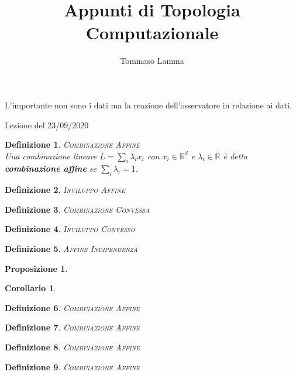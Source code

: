 \documentclass{article}
\title{Appunti di Topologia Computazionale}
\author{Tommaso Lamma}
\newtheorem{defn}{Definizione}[section]
\newtheorem{prop}[thm]{Proposizione}
\newtheorem{cor}{Corollario}[thm]
\newcommand{\bb}[1]{\textbf{#1}}
\newcommand{\R}{\mathbb{R}}
\begin{document}
\maketitle
L'importante non sono i dati ma la reazione dell'osservatore in relazione ai dati.\\
  \begin{section}{Lezione del 23/09/2020}
    \begin{defn}{\scshape Combinazione Affine\\}
      Una combinazione lineare $L=\sum_i \lambda_i x_i$ con $x_i \in \R^d$ e $\lambda_i \in \R$
      è detta \bb{combinazione affine} se $\sum_i \lambda_i=1$.
    \end{defn}
    \begin{defn}{\scshape Inviluppo Affine\\}
    \end{defn}
    \begin{defn}{\scshape Combinazione Convessa\\}
    \end{defn}
    \begin{defn}{\scshape Inviluppo Convesso\\}
    \end{defn}
    \begin{defn}{\scshape Affine Indipendenza\\}
    \end{defn}
    \begin{prop}%
    \end{prop}
    \begin{cor}%
    \end{cor}
    \begin{defn}{\scshape Combinazione Affine\\}
    \end{defn}
    \begin{defn}{\scshape Combinazione Affine\\}
    \end{defn}
    \begin{defn}{\scshape Combinazione Affine\\}
    \end{defn}
    \begin{defn}{\scshape Combinazione Affine\\}
    \end{defn}
  \end{section}
\end{document}
